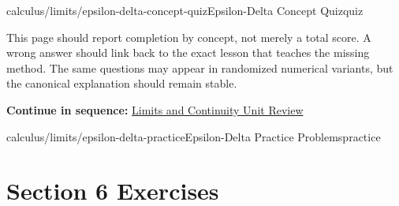 \documentclass[11pt,openany]{book}
\theoremstyle{bgplain}
\newcommand{\webnext}[2]{%
  \par\addvspace{1.2em}\noindent{\color{BGLine}\rule{\textwidth}{0.35pt}}\par\smallskip
  {\small\color{BGGray}\textbf{Continue in sequence:} \hyperlink{web:#1}{#2}}\par
}
\begin{document}
\begin{webpage}{calculus/limits/epsilon-delta-concept-quiz}{Epsilon-Delta Concept Quiz}{quiz}
\begin{bgsummary}[title={Quiz use on the website}]
This page should report completion by concept, not merely a total score. A wrong answer should link back to the exact lesson that teaches the missing method. The same questions may appear in randomized numerical variants, but the canonical explanation should remain stable.
\end{bgsummary}
\webnext{calculus/limits/unit-review}{Limits and Continuity Unit Review}
\end{webpage}

\begin{webpage}{calculus/limits/epsilon-delta-practice}{Epsilon-Delta Practice Problems}{practice}
\section*{Section 6 Exercises}


\end{webpage}
\end{document}

